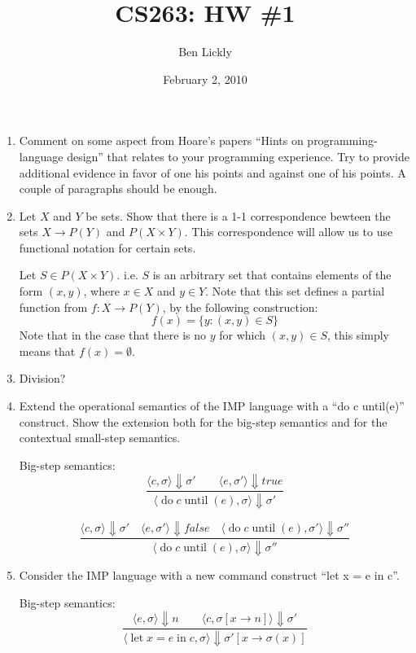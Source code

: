 \documentclass{article}
\title{CS263: HW \#1}
\author{Ben Lickly}
\date{February 2, 2010}
\begin{document}
\maketitle
\begin{enumerate}
  \item Comment on some aspect from Hoare's papers ``Hints on
  programming-language design'' that relates to your programming experience. Try
  to provide additional evidence in favor of one his points and against one of
  his points. A couple of paragraphs should be enough.
  
  
  \item Let $X$ and $Y$ be sets. Show that there is a 1-1 correspondence bewteen
  the sets $X \rightarrow P(Y)$ and $P(X \times Y )$. This correspondence will
  allow us to use functional notation for certain sets.
  
  Let $S \in P(X \times Y)$. i.e. $S$ is an arbitrary set that contains elements
  of the form $(x,y)$, where $x \in X$ and $y \in Y$.  Note that this set
  defines a partial function from $f : X \rightarrow P(Y)$, by the following
  construction:
  \[
  f(x) = \{ y : (x,y) \in S \}
  \]
  Note that in the case that there is no $y$ for which $(x,y) \in S$, this
  simply means that $f(x) = \emptyset$.
  
  \item Division?
  
  \item Extend the operational semantics of the IMP language with a ``do c
  until(e)'' construct. Show the extension both for the big-step semantics and
  for the contextual small-step semantics.
  \newcommand{\dountil}[2]{\operatorname{do} #1 \operatorname{until}(#2)}
  
  Big-step semantics:
  \[\frac{
  \langle c, \sigma \rangle \Downarrow \sigma'   \qquad
  \langle e, \sigma' \rangle \Downarrow true }
  {\langle \dountil{c}{e}, \sigma \rangle \Downarrow \sigma'}
  \]

  \[\frac{
  \langle c, \sigma \rangle \Downarrow \sigma'   \quad
  \langle e, \sigma' \rangle \Downarrow false    \quad
  \langle \dountil{c}{e}, \sigma' \rangle \Downarrow \sigma'' }
  {\langle \dountil{c}{e}, \sigma \rangle \Downarrow \sigma'' }
  \]

  \item Consider the IMP language with a new command construct ``let x = e in
  c''.
  \newcommand{\letin}[2]{\operatorname{let} x = #1 \operatorname{in} #2}
  
Big-step semantics:
  \[\frac{
  \langle e, \sigma \rangle \Downarrow n    \qquad
  \langle c, \sigma[x \rightarrow n] \rangle \Downarrow \sigma' }
  {\langle \letin{e}{c}, \sigma \rangle \Downarrow
          \sigma'[x \rightarrow \sigma(x)]}
  \]
\end{enumerate}
\end{document}
